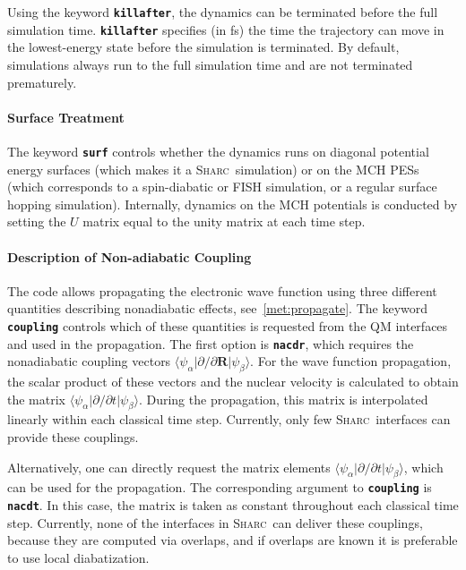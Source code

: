 \documentclass[a4paper,10pt,DIV=15,openany]{scrbook}
\newcommand{\sharc}{\textsc{Sharc}}
\newcommand{\ttt}[1]{\textbf{\texttt{#1}}}
\newcommand{\VEC}[1]{\ensuremath{\mathbf{#1}}}
\begin{document}
Using the keyword \ttt{killafter}, the dynamics can be terminated before the full simulation time. \ttt{killafter} specifies (in fs) the time the trajectory can move in the lowest-energy state before the simulation is terminated. By default, simulations always run to the full simulation time and are not terminated prematurely.

\paragraph{Surface Treatment}

The keyword \ttt{surf} controls whether the dynamics runs on diagonal potential energy surfaces (which makes it a \sharc\ simulation) or on the MCH PESs (which corresponds to a spin-diabatic \cite{Granucci2012JCP} or FISH \cite{Mitric2009PRA} simulation, or a regular surface hopping simulation). Internally, dynamics on the MCH potentials is conducted by setting the $U$ matrix equal to the unity matrix at each time step. 

\paragraph{Description of Non-adiabatic Coupling}

The code allows propagating the electronic wave function using three different quantities describing nonadiabatic effects, see~\ref{met:propagate}. The keyword \ttt{coupling} controls which of these quantities is requested from the QM interfaces and used in the propagation. The first option is \ttt{nacdr}, which requires the nonadiabatic coupling vectors $\langle\psi_\alpha|\partial/\partial \VEC{R}|\psi_\beta\rangle$. For the wave function propagation, the scalar product of these vectors and the nuclear velocity is calculated to obtain the matrix $\langle\psi_\alpha|\partial/\partial t|\psi_\beta\rangle$. During the propagation, this matrix is interpolated linearly within each classical time step. Currently, only few \sharc\ interfaces can provide these couplings.

Alternatively, one can directly request the matrix elements $\langle\psi_\alpha|\partial/\partial t|\psi_\beta\rangle$, which can be used for the propagation. The corresponding argument to \ttt{coupling} is \ttt{nacdt}. In this case, the matrix is taken as constant throughout each classical time step. Currently, none of the interfaces in \sharc\ can deliver these couplings, because they are computed via overlaps, and if overlaps are known it is preferable to use local diabatization.
\end{document}
